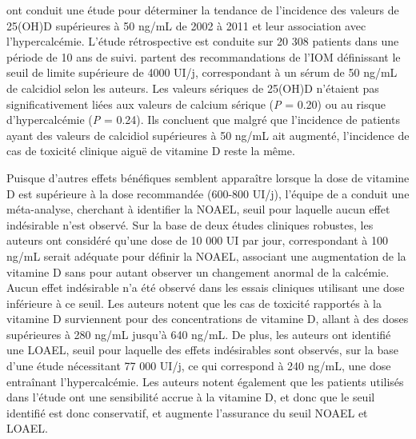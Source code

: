 \documentclass[
  a4paper,
  DIV=11,
  numbers=noendperiod,
  listof=totoc]{scrreprt}
\begin{document}
\textcite{Dudenkov.2015} ont conduit une étude pour déterminer la
tendance de l'incidence des valeurs de 25(OH)D supérieures à 50 ng/mL de
2002 à 2011 et leur association avec l'hypercalcémie. L'étude
rétrospective est conduite sur 20 308 patients dans une période de 10
ans de suivi. \textcite{Dudenkov.2015} partent des recommandations de
l'IOM définissant le seuil de limite supérieure de 4000 UI/j,
correspondant à un sérum de 50 ng/mL de calcidiol selon les auteurs. Les
valeurs sériques de 25(OH)D n'étaient pas significativement liées aux
valeurs de calcium sérique (\emph{P} = 0.20) ou au risque
d'hypercalcémie (\emph{P} = 0.24). Ils concluent que malgré que
l'incidence de patients ayant des valeurs de calcidiol supérieures à 50
ng/mL ait augmenté, l'incidence de cas de toxicité clinique aiguë de
vitamine D reste la même.

Puisque d'autres effets bénéfiques semblent apparaître lorsque la dose
de vitamine D est supérieure à la dose recommandée (600-800 UI/j),
l'équipe de \textcite{Hathcock.2007} a conduit une méta-analyse,
cherchant à identifier la \ac{NOAEL}, seuil pour laquelle aucun effet
indésirable n'est observé. Sur la base de deux études cliniques
robustes, les auteurs ont considéré qu'une dose de 10 000 UI par jour,
correspondant à 100 ng/mL serait adéquate pour définir la \ac{NOAEL},
associant une augmentation de la vitamine D sans pour autant observer un
changement anormal de la calcémie. Aucun effet indésirable n'a été
observé dans les essais cliniques utilisant une dose inférieure à ce
seuil. Les auteurs notent que les cas de toxicité rapportés à la
vitamine D surviennent pour des concentrations de vitamine D, allant à
des doses supérieures à 280 ng/mL jusqu'à 640 ng/mL. De plus, les
auteurs ont identifié une \ac{LOAEL}, seuil pour laquelle des effets
indésirables sont observés, sur la base d'une étude nécessitant 77 000
UI/j, ce qui correspond à 240 ng/mL, une dose entraînant
l'hypercalcémie. Les auteurs notent également que les patients utilisés
dans l'étude ont une sensibilité accrue à la vitamine D, et donc que le
seuil identifié est donc conservatif, et augmente l'assurance du seuil
\ac{NOAEL} et \ac{LOAEL}.
\end{document}
